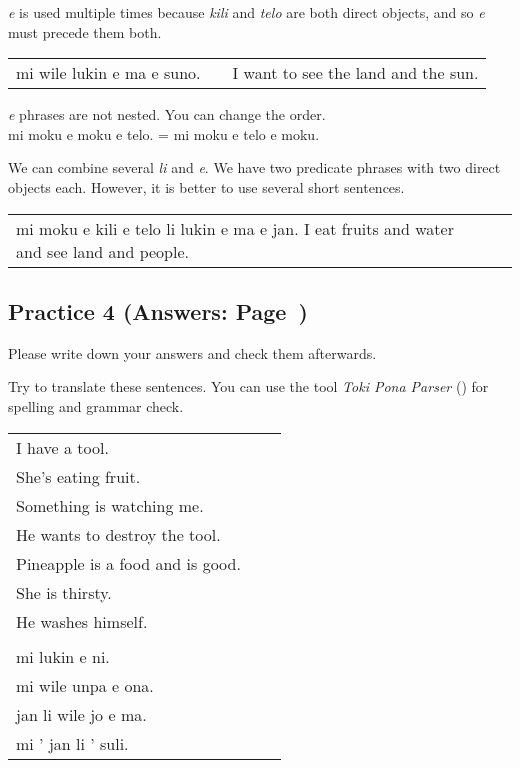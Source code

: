 \textit{e} is used multiple times because \textit{kili} and \textit{telo} are both direct objects, and so \textit{e} must precede them both. 

\begin{supertabular}{p{5,5cm}|ll}
mi wile lukin e ma e suno. && I want to see the land and the sun. \\
\end{supertabular} 
\textit{e} phrases are not nested. You can change the order. \\
mi moku e moku e telo. = mi moku e telo e moku. 

We can combine several \textit{li} and \textit{e}.
We have two predicate phrases with two direct objects each. 
However, it is better to use several short sentences. 

\begin{supertabular}{p{5,5cm}|ll}
mi moku e kili e telo li lukin e ma e jan. I eat fruits and water and see land and people. \\
\end{supertabular} 

%
\newpage
\subsection*{Practice 4 (Answers: Page~\pageref{'direct_objects_compund_sentences'})}
%
Please write down your answers and check them afterwards. 


Try to translate these sentences. 
You can use the tool \textit{Toki Pona Parser} (\cite{www:rowa:02}) for spelling and grammar check. 

\begin{supertabular}{p{5,5cm}|ll}
I have a tool. &&  \\ %
She's eating fruit. &&  \\ %
Something is watching me. &&  \\ %
He wants to destroy the tool. &&  \\ %
Pineapple is a food and is good. &&  \\ %
She is thirsty. && \\ %
He washes himself. &&  \\ %
  && \\ %
mi lukin e ni. &&  \\ %
mi wile unpa e ona. &&   \\ %
jan li wile jo e ma. &&  \\ %
mi ' jan li ' suli. &&  \\ %
\end{supertabular} 
